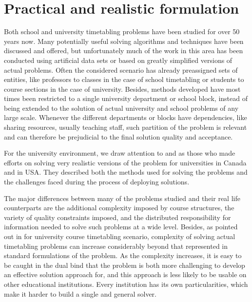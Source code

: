 \section{Practical and realistic formulation}

Both school and university timetabling problems have been studied for over 50 years now. Many potentially useful solving algorithms and techniques have been discussed and offered, but unfortunately much of the work in this area has been conducted using artificial data sets or based on greatly simplified versions of actual problems. Often the considered scenario has already preassigned sets of entities, like professors to classes in the case of school timetabling or students to course sections in the case of university. Besides, methods developed have most times been restricted to a single university department or school block, instead of being extended to the solution of actual university and school problems of any large scale. Whenever the different departments or blocks have dependencies, like sharing resources, usually teaching staff, such partition of the problem is relevant and can therefore be prejudicial to the final solution quality and acceptance.

For the university environment, we draw attention to \cite{Carter2001} and \cite{Murray2007} as those who made efforts on solving very realistic versions of the problem for universities in Canada and in USA. They described both the methods used for solving the problems and the challenges faced during the process of deploying solutions.

The major differences between many of the problems studied and their real life counterparts are the additional complexity imposed by course structures, the variety of quality constraints imposed, and the distributed responsibility for information needed to solve such problems at a wide level. Besides, as pointed out in \cite{Murray2007} for university course timetabling scenario, complexity of solving actual timetabling problems can increase considerably beyond that represented in standard formulations of the problem. As the complexity increases, it is easy to be caught in the dual bind that the problem is both more challenging to develop an effective solution approach for, and this approach is less likely to be usable on other educational institutions. Every institution has its own particularities, which make it harder to build a single and general solver.

